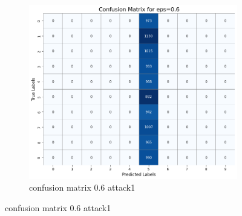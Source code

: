 \documentclass[11pt,onside]{article}
\begin{document}
\begin{figure}[h]
  \centering
  \begin{subfigure}[b]{0.49\textwidth}
    \centering
    \includegraphics[width=\textwidth]{V2_images/confusion_matrix_eps_0.6_attack_1.png}
    \caption{confusion matrix 0.6 attack1}
    \label{fig:image1}
  \end{subfigure}
  
\end{figure}

\clearpage %
\end{document}
